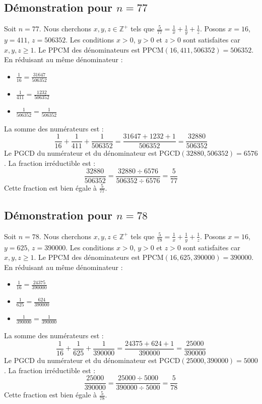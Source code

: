 \documentclass[11pt,a4paper]{article}
\begin{document}
\subsection{Démonstration pour $n = 77$}
Soit $n = 77$. Nous cherchons $x, y, z \in \mathbb{Z}^{+}$ tels que $\frac{5}{77} = \frac{1}{x} + \frac{1}{y} + \frac{1}{z}$.
Posons $x = 16$, $y = 411$, $z = 506352$.
Les conditions $x > 0$, $y > 0$ et $z > 0$ sont satisfaites car $x, y, z \geq 1$.
Le PPCM des dénominateurs est $\text{PPCM}(16, 411, 506352) = 506352$.
En réduisant au même dénominateur :
\begin{itemize}
    \item $\frac{1}{16} = \frac{31647}{506352}$
    \item $\frac{1}{411} = \frac{1232}{506352}$
    \item $\frac{1}{506352} = \frac{1}{506352}$
\end{itemize}
La somme des numérateurs est :
$$ \frac{1}{16} + \frac{1}{411} + \frac{1}{506352} = \frac{31647 + 1232 + 1}{506352} = \frac{32880}{506352} $$
Le PGCD du numérateur et du dénominateur est $\text{PGCD}(32880, 506352) = 6576$.
La fraction irréductible est :
$$ \frac{32880}{506352} = \frac{32880 \div 6576}{506352 \div 6576} = \frac{5}{77} $$
Cette fraction est bien égale à $\frac{5}{77}$.

\subsection{Démonstration pour $n = 78$}
Soit $n = 78$. Nous cherchons $x, y, z \in \mathbb{Z}^{+}$ tels que $\frac{5}{78} = \frac{1}{x} + \frac{1}{y} + \frac{1}{z}$.
Posons $x = 16$, $y = 625$, $z = 390000$.
Les conditions $x > 0$, $y > 0$ et $z > 0$ sont satisfaites car $x, y, z \geq 1$.
Le PPCM des dénominateurs est $\text{PPCM}(16, 625, 390000) = 390000$.
En réduisant au même dénominateur :
\begin{itemize}
    \item $\frac{1}{16} = \frac{24375}{390000}$
    \item $\frac{1}{625} = \frac{624}{390000}$
    \item $\frac{1}{390000} = \frac{1}{390000}$
\end{itemize}
La somme des numérateurs est :
$$ \frac{1}{16} + \frac{1}{625} + \frac{1}{390000} = \frac{24375 + 624 + 1}{390000} = \frac{25000}{390000} $$
Le PGCD du numérateur et du dénominateur est $\text{PGCD}(25000, 390000) = 5000$.
La fraction irréductible est :
$$ \frac{25000}{390000} = \frac{25000 \div 5000}{390000 \div 5000} = \frac{5}{78} $$
Cette fraction est bien égale à $\frac{5}{78}$.
\end{document}
